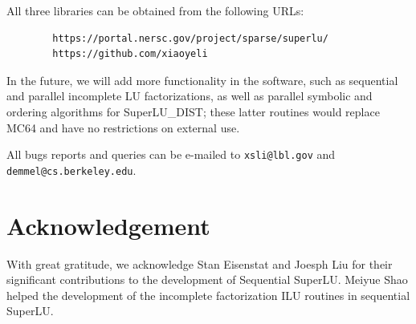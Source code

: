 All three libraries can be obtained from the following URLs:
\begin{verbatim}
        https://portal.nersc.gov/project/sparse/superlu/
        https://github.com/xiaoyeli
\end{verbatim}


In the future, we will add more functionality in the software,
such as sequential and parallel incomplete LU factorizations,
as well as parallel symbolic and ordering algorithms for 
SuperLU\_DIST; these latter routines would replace MC64 and have
no restrictions on external use.

All bugs reports and queries can be e-mailed to
{\tt xsli@lbl.gov} and {\tt demmel@cs.berkeley.edu}.




\section{Acknowledgement}
With great gratitude, we acknowledge Stan Eisenstat and Joesph Liu for
their significant contributions to the development of Sequential SuperLU.
Meiyue Shao helped the development of the incomplete factorization ILU
routines in sequential SuperLU.

